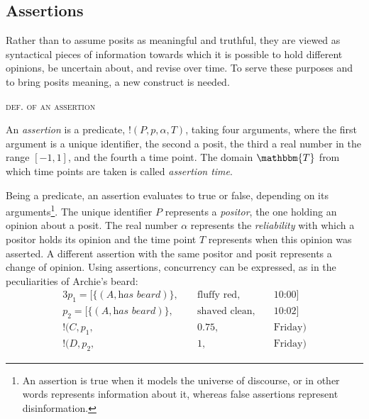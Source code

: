 \documentclass[sfsidenotes,nobib,twoside,symmetric]{tufte-handout}
\newcommand{\assert}{\text{!}}
\newcounter{majorcount}
\newcommand{\deffy}[3]{
	\vspace{2ex}
	\refstepcounter{majorcount} 
	\noindent\textsc{#1}%
	\\\begin{small}
	\noindent #2%
	\label{Def:#3}
	\end{small}
	\vspace{2ex}
}
\begin{document}

\subsection{Assertions}
%
Rather than to assume posits as meaningful and truthful, they are viewed as syntactical pieces of information towards which it is possible to hold different opinions, be uncertain about, and revise over time. To serve these purposes and to bring posits meaning, a new construct is needed.

\deffy{def. of an assertion}{%
An \emph{assertion} is a predicate, $\assert(P, p, \alpha, T)$, taking four arguments, where the first argument is a unique identifier, the second a posit, the third a real number in the range $[-1, 1]$, and the fourth a time point. The domain $\mathbbm{T}$ from which time points are taken is called \emph{assertion time}.
}{assertion}

Being a predicate, an assertion evaluates to true or false, depending on its arguments\footnote{An assertion is true when it models the universe of discourse, or in other words represents information about it, whereas false assertions represent disinformation.}. The unique identifier $P$ represents a \emph{positor}, the one holding an opinion about a posit. The real number $\alpha$ represents the \emph{reliability} with which a positor holds its opinion and the time point $T$ represents when this opinion was asserted. A different assertion with the same positor and posit represents a change of opinion. Using assertions, concurrency can be expressed, as in the peculiarities of Archie's beard:
\begin{alignat*}{3}
p_{1} =[\{(A, \textit{has beard})\},\;&& \textrm{fluffy red},\;&& \textrm{10:00}] \\
p_{2} = [\{(A, \textit{has beard})\},\;&& \textrm{shaved clean},\;&& \textrm{10:02}] \\
\assert(C, p_{1},\;&& 0.75,\;&& \textrm{Friday}) \\
\assert(D, p_{2},\;&& 1,\;&& \textrm{Friday}) 
\end{alignat*}
\end{document}
